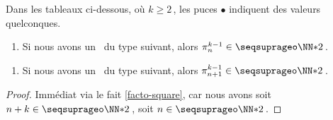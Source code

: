\begin{fact} \label{sftab-recu}
	Dans les tableaux ci-dessous, où $k \geq 2$\,, les puces $\bullet$ indiquent des valeurs quelconques.

	\begin{enumerate}
		\item Si nous avons un \sftab\ du type suivant, alors $\consprod<k-1> \in \NNssquare$\,.
	\end{enumerate}

	\begin{center}
	\end{center}


	\begin{enumerate}[start=2]
		\item Si nous avons un \sftab\ du type suivant, alors $\consprod[n+1]<k-1> \in \NNssquare$\,.
	\end{enumerate}

	\begin{center}
	\end{center}
\end{fact}


\begin{proof}
	Immédiat via le fait \ref{facto-square}, car nous avons soit $n + k \in \NNssquare$\,, soit $n \in \NNssquare$\,.
\end{proof}




